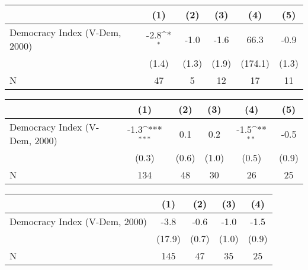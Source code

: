 {
\def\sym#1{\ifmmode^{#1}\else\(^{#1}\)\fi}
\begin{tabular}{l*{5}{c}}
\hline\hline
                    &\multicolumn{1}{c}{(1)}         &\multicolumn{1}{c}{(2)}         &\multicolumn{1}{c}{(3)}         &\multicolumn{1}{c}{(4)}         &\multicolumn{1}{c}{(5)}         \\
\hline
Democracy Index (V-Dem, 2000)&        -2.8\sym{*}  &        -1.0         &        -1.6         &        66.3         &        -0.9         \\
                    &       (1.4)         &       (1.3)         &       (1.9)         &     (174.1)         &       (1.3)         \\
\hline
N                   &          47         &           5         &          12         &          17         &          11         \\
\hline\hline
\end{tabular}
}
{
\def\sym#1{\ifmmode^{#1}\else\(^{#1}\)\fi}
\begin{tabular}{l*{5}{c}}
\hline\hline
                    &\multicolumn{1}{c}{(1)}         &\multicolumn{1}{c}{(2)}         &\multicolumn{1}{c}{(3)}         &\multicolumn{1}{c}{(4)}         &\multicolumn{1}{c}{(5)}         \\
\hline
Democracy Index (V-Dem, 2000)&        -1.3\sym{***}&         0.1         &         0.2         &        -1.5\sym{**} &        -0.5         \\
                    &       (0.3)         &       (0.6)         &       (1.0)         &       (0.5)         &       (0.9)         \\
\hline
N                   &         134         &          48         &          30         &          26         &          25         \\
\hline\hline
\end{tabular}
}
{
\def\sym#1{\ifmmode^{#1}\else\(^{#1}\)\fi}
\begin{tabular}{l*{4}{c}}
\hline\hline
                    &\multicolumn{1}{c}{(1)}         &\multicolumn{1}{c}{(2)}         &\multicolumn{1}{c}{(3)}         &\multicolumn{1}{c}{(4)}         \\
\hline
Democracy Index (V-Dem, 2000)&        -3.8         &        -0.6         &        -1.0         &        -1.5         \\
                    &      (17.9)         &       (0.7)         &       (1.0)         &       (0.9)         \\
\hline
N                   &         145         &          47         &          35         &          25         \\
\hline\hline
\end{tabular}
}
